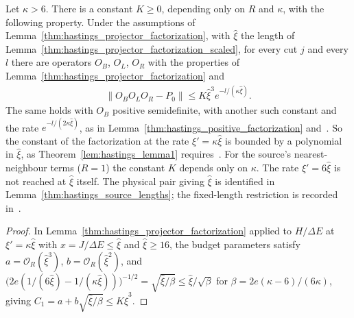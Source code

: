 \begin{lemma}
    \label{thm:hastings_lemma1_polynomial_constant}
    \leanok
    Let $\kappa>6$. There is a constant $K\ge0$, depending only on $R$ and
    $\kappa$, with the following property. Under the assumptions of
    Lemma~\ref{thm:hastings_projector_factorization}, with $\hat\xi$ the
    length of Lemma~\ref{thm:hastings_projector_factorization_scaled}, for
    every cut $j$ and every $l$ there are operators $O_B$, $O_L$, $O_R$ with
    the properties of Lemma~\ref{thm:hastings_projector_factorization} and
    \begin{align}
        \|O_BO_LO_R-P_0\|\le K\hat\xi^3e^{-l/(\kappa\hat\xi)}.
        \label{eq:hastings_lemma1_polynomial_constant}
    \end{align}
    The same holds with $O_B$ positive semidefinite, with another such constant
    and the rate $e^{-l/(2\kappa\hat\xi)}$, as in
    Lemma~\ref{thm:hastings_positive_factorization}
    and~\cite{gap:hastings07_lemma1_positivity_rate}.
    So the constant of the factorization at the rate $\xi'=\kappa\hat\xi$ is
    bounded by a polynomial in $\hat\xi$, as Theorem~\ref{lem:hastings_lemma1}
    requires~\cite[lines 258--262]{Hastings2007AreaLaw}. For the source's
    nearest-neighbour terms ($R=1$) the constant $K$ depends only on
    $\kappa$. The rate $\xi'=6\hat\xi$ is not reached at $\hat\xi$ itself.
    The physical pair giving $\hat\xi$ is identified in
    Lemma~\ref{thm:hastings_source_lengths}; the fixed-length restriction is
    recorded in~\cite{gap:hastings07_gaussian_average_exponent}.
\end{lemma}
\begin{proof}\leanok
    In Lemma~\ref{thm:hastings_projector_factorization} applied to
    $H/\Delta E$ at $\xi'=\kappa\hat\xi$ with $x=J/\Delta E\le\hat\xi$ and
    $\hat\xi\ge16$, the budget parameters satisfy $a=\mathcal O_R(\hat\xi^3)$,
    $b=\mathcal O_R(\hat\xi^2)$, and
    $\bigl(2e(1/(6\hat\xi)-1/(\kappa\hat\xi))\bigr)^{-1/2}
        =\sqrt{\hat\xi/\beta}\le\hat\xi/\sqrt\beta$ for
    $\beta=2e(\kappa-6)/(6\kappa)$, giving
    $C_1=a+b\sqrt{\hat\xi/\beta}\le K\hat\xi^3$.
\end{proof}

